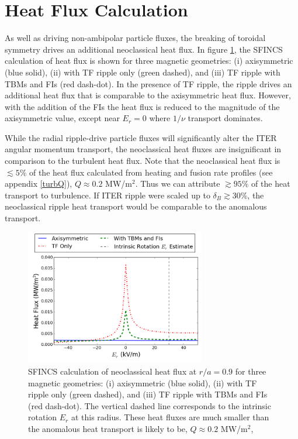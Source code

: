 \documentclass[aip, pop, preprint]{revtex4-1}
\numberwithin{figure}{section}
\numberwithin{equation}{section}
\begin{document}
\FloatBarrier

\section{Heat Flux Calculation}\label{heatflux}
As well as driving non-ambipolar particle fluxes, the breaking of toroidal symmetry drives an additional neoclassical heat flux. In figure \ref{fig:HeatFlux}, the SFINCS calculation of heat flux is shown for three magnetic geometries: (i) axisymmetric (blue solid), (ii) with TF ripple only (green dashed), and (iii) TF ripple with TBMs and FIs (red dash-dot). In the presence of TF ripple, the ripple drives an additional heat flux that is comparable to the axisymmetric heat flux. However, with the addition of the FIs the heat flux is reduced to the magnitude of the axisymmetric value, except near $E_r = 0$ where $1/\nu$ transport dominates. 

While the radial ripple-drive particle fluxes will significantly alter the ITER angular momentum transport, the neoclassical heat fluxes are insignificant in comparison to the turbulent heat flux. Note that the neoclassical heat flux is $\lesssim 5\%$  of the heat flux calculated from heating and fusion rate profiles (see appendix \ref{turbQ}), $Q\approx 0.2$ MW/m$^2$. Thus we can attribute $\gtrsim 95\%$ of the heat transport to turbulence. If ITER ripple were scaled up to $\delta_B \gtrsim 30\%$, the neoclassical ripple heat transport would be comparable to the anomalous transport.

\begin{figure}[h!]
\centering
\includegraphics[width=0.7\textwidth]
{HeatFlux.png}
\caption{\label{fig:HeatFlux} SFINCS calculation of neoclassical heat flux at $r/a = 0.9$ for three magnetic geometries: (i) axisymmetric (blue solid), (ii) with TF ripple only (green dashed), and (iii) TF ripple with TBMs and FIs (red dash-dot). The vertical dashed line corresponds to the intrinsic rotation $E_r$ at this radius. These heat fluxes are much smaller than the anomalous heat transport is likely to be, $Q\approx 0.2$ MW/m$^2$,}
\end{figure}
\end{document}
